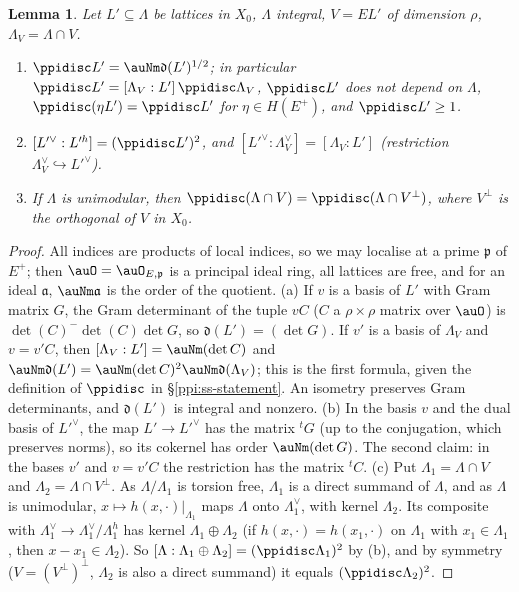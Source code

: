 \documentclass[10pt]{amsart}
\newtheorem{lemma}[theorem]{Lemma}
\theoremstyle{definition}
\theoremstyle{remark}
\begin{document}
\begin{lemma}\label{pbc:disc}
Let $L'\subseteq\Lambda$ be lattices in $X_0$, $\Lambda$ integral, $V=EL'$ of dimension $\rho$, $\Lambda_V=
\Lambda\cap V$.
\begin{enumerate}
\item[(a)] $\ppidisc L'=\auNm\mathfrak d(L')^{1/2}$; in particular $\ppidisc L'=[\Lambda_V:L']\,\ppidisc
\Lambda_V$, $\ppidisc L'$ does not depend on $\Lambda$, $\ppidisc(\eta L')=\ppidisc L'$ for $\eta\in
H(E^+)$, and $\ppidisc L'\ge1$.
\item[(b)] $[L'^\vee:L'^h]=(\ppidisc L')^2$, and $[L'^\vee:\Lambda_V^\vee]=[\Lambda_V:L']$ (restriction
$\Lambda_V^\vee\hookrightarrow L'^\vee$).
\item[(c)] If $\Lambda$ is unimodular, then $\ppidisc(\Lambda\cap V)=\ppidisc(\Lambda\cap V^\perp)$, where
$V^\perp$ is the orthogonal of $V$ in $X_0$.
\end{enumerate}
\end{lemma}
\begin{proof}
All indices are products of local indices, so we may localise at a prime $\mathfrak p$ of $E^+$; then
$\auO=\auO_{E,\mathfrak p}$ is a principal ideal ring, all lattices are free, and for an ideal $\mathfrak
a$, $\auNm\mathfrak a$ is the order of the quotient. (a) If $v$ is a basis of $L'$ with Gram matrix $G$,
the Gram determinant of the tuple $vC$ ($C$ a $\rho\times\rho$ matrix over $\auO$) is $\det(C)^-\det(C)
\det G$, so $\mathfrak d(L')=(\det G)$. If $v'$ is a basis of $\Lambda_V$ and $v=v'C$, then $[\Lambda_V:L']=
\auNm(\det C)$ and $\auNm\mathfrak d(L')=\auNm(\det C)^2\auNm\mathfrak d(\Lambda_V)$; this is the first
formula, given the definition of $\ppidisc$ in \S\ref{ppi:ss-statement}. An isometry preserves Gram
determinants, and $\mathfrak d(L')$ is integral and nonzero. (b) In the basis $v$ and the dual basis
of $L'^\vee$, the map $L'\to L'^\vee$ has the matrix ${}^tG$ (up to the conjugation, which preserves
norms), so its cokernel has order $\auNm(\det G)$. The second claim: in the bases $v'$ and $v=v'C$
the restriction has the matrix ${}^tC$. (c) Put $\Lambda_1=\Lambda\cap V$ and $\Lambda_2=\Lambda\cap
V^\perp$. As $\Lambda/\Lambda_1$ is torsion free, $\Lambda_1$ is a direct summand of $\Lambda$, and as
$\Lambda$ is unimodular, $x\mapsto h(x,\cdot)|_{\Lambda_1}$ maps $\Lambda$ onto $\Lambda_1^\vee$, with
kernel $\Lambda_2$. Its composite with $\Lambda_1^\vee\to\Lambda_1^\vee/\Lambda_1^h$ has kernel $\Lambda_1
\oplus\Lambda_2$ (if $h(x,\cdot)=h(x_1,\cdot)$ on $\Lambda_1$ with $x_1\in\Lambda_1$, then $x-x_1\in
\Lambda_2$). So $[\Lambda:\Lambda_1\oplus\Lambda_2]=(\ppidisc\Lambda_1)^2$ by (b), and by symmetry ($V=
(V^\perp)^\perp$, $\Lambda_2$ is also a direct summand) it equals $(\ppidisc\Lambda_2)^2$.
\end{proof}
\end{document}
